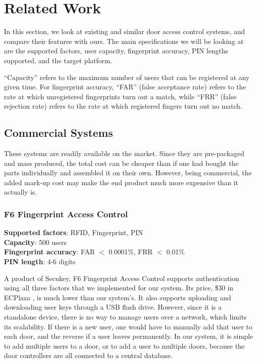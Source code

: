 \pagebreak
\section{Related Work}

In this section, we look at existing and similar door access control systems, and compare their features with ours. The main specifications we will be looking at are the supported factors, user capacity, fingerprint accuracy, PIN lengths supported, and the target platform.

``Capacity'' refers to the maximum number of users that can be registered at any given time. For fingerprint accuracy, ``FAR'' (false acceptance rate) refers to the rate at which unregistered fingerprints turn out a match, while ``FRR'' (false rejection rate) refers to the rate at which registered fingers turn out no match.

\subsection{Commercial Systems}
These systems are readily available on the market. Since they are pre-packaged and mass produced, the total cost can be cheaper than if one had bought the parts individually and assembled it on their own. However, being commercial, the added mark-up cost may make the end product much more expensive than it actually is.

\subsubsection{F6 Fingerprint Access Control}
\begin{spacing}{1.35}
\textbf{Supported factors}: RFID, Fingerprint, PIN \\
\textbf{Capacity}: 500 users \\
\textbf{Fingerprint accuracy}: FAR $<$ 0.0001\%, FRR $<$ 0.01\% \\
\textbf{PIN length}: 4-6 digits \\
\end{spacing}

\noindent A product of Secukey, F6 Fingerprint Access Control \cite{Secukey_F6} supports authentication using all three factors that we implemented for our system. Its price, \$30 in ECPlaza \cite{Secukey_ezplaza}, is much lower than our system's. It also supports uploading and downloading user keys through a USB flash drive. However, since it is a standalone device, there is no way to manage users over a network, which limits its scalability. If there is a new user, one would have to manually add that user to each door, and the reverse if a user leaves permanently. In our system, it is simple to add multiple users to a door, or to add a user to multiple doors, because the door controllers are all connected to a central database.

